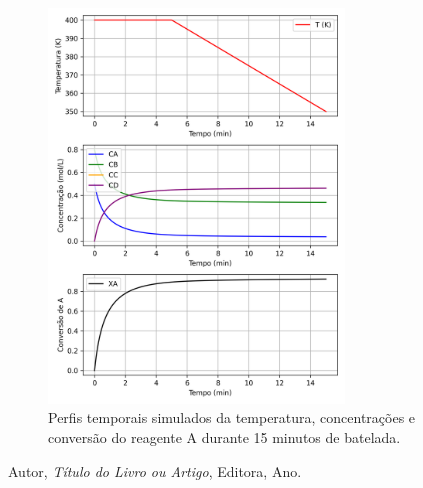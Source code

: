 \documentclass{article}
\begin{document}


\begin{figure}[ht]
  \centering
  \includegraphics[width=0.7\textwidth]{figuras/questao3_reator.png}
  \caption{Perfis temporais simulados da temperatura, concentrações e conversão do reagente A durante 15 minutos de batelada.}
  \label{fig:questao3}
\end{figure}



\begin{thebibliography}{9}
  Autor, \emph{Título do Livro ou Artigo}, Editora, Ano.
\end{thebibliography}
\end{document}
